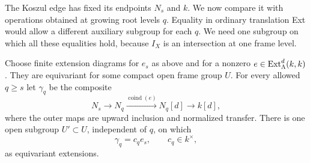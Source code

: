 The Koszul edge has fixed its endpoints $N_s$ and $k$. We now compare
it with operations obtained at growing root levels $q$. Equality in
ordinary translation Ext would allow a different auxiliary subgroup
for each $q$. We need one subgroup on which all these equalities hold,
because $I_X$ is an intersection at one frame level.

\begin{lemma}
\label{lem:uniform-ext}
Choose finite extension diagrams for $e_s$ as above and for a nonzero
$e\in\operatorname{Ext}^d_\Lambda(k,k)$.  They are equivariant for some compact
open frame group $U$.  For every allowed $q\geq s$ let $\gamma_q$ be
the composite
\begin{equation}\label{eq:compact:coinduced-extension}
 N_s\longrightarrow N_q
 \xrightarrow{\operatorname{coind}(e)}N_q[d]
 \longrightarrow k[d],
\end{equation}
where the outer maps are upward inclusion and normalized transfer.
There is one open subgroup $U'\subset U$, independent of $q$, on
which
\[
                         \gamma_q=c_qe_s,
                       \qquad c_q\in k^\times,
\]
as equivariant extensions.
\end{lemma}

